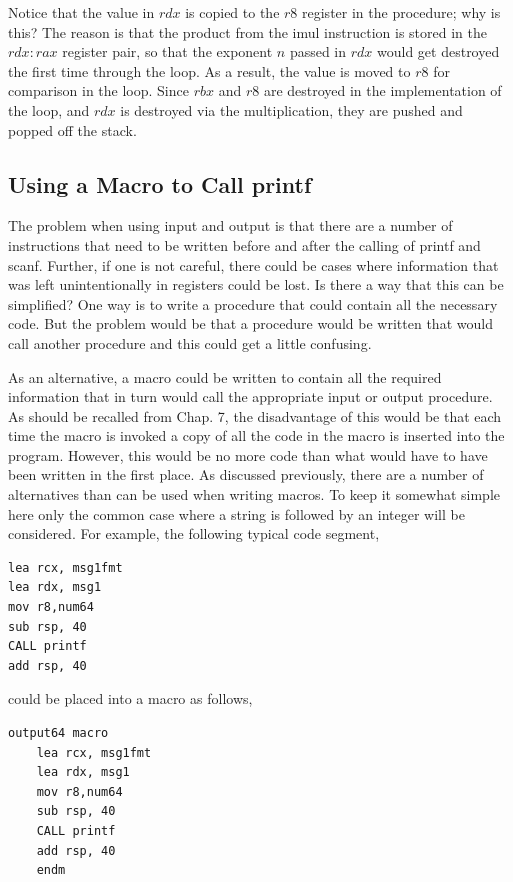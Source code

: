 \documentclass[10pt]{book}
\begin{document}
Notice that the value in $rdx$ is copied to the $r8$ register in the procedure; why is this? The reason is that the product from the imul instruction is stored in the $rdx\!:\!rax$ register pair, so that the exponent $n$ passed in $rdx$ would get destroyed the first time through the loop. As a result, the value is moved to $r8$ for comparison in the loop. Since $rbx$ and $r8$ are destroyed in the implementation of the loop, and $rdx$ is destroyed via the multiplication, they are pushed and popped off the stack.

\subsection{Using a Macro to Call printf}
The problem when using input and output is that there are a number of instructions that need to be written before and after the calling of printf and scanf. Further, if one is not careful, there could be cases where information that was left unintentionally in registers could be lost. Is there a way that this can be simplified? One way is to write a procedure that could contain all the necessary code. But the problem would be that a procedure would be written that would call another procedure and this could get a little confusing.

As an alternative, a macro could be written to contain all the required information that in turn would call the appropriate input or output procedure. As should be recalled from Chap. 7, the disadvantage of this would be that each time the macro is invoked a copy of all the code in the macro is inserted into the program. However, this would be no more code than what would have to have been written in the first place. As discussed previously, there are a number of alternatives than can be used when writing macros. To keep it somewhat simple here only the common case where a string is followed by an integer will be considered. For example, the following typical code segment,

\begin{verbatim}
lea rcx, msg1fmt
lea rdx, msg1
mov r8,num64
sub rsp, 40
CALL printf
add rsp, 40
\end{verbatim}

could be placed into a macro as follows,

\begin{verbatim}
output64 macro
    lea rcx, msg1fmt
    lea rdx, msg1
    mov r8,num64
    sub rsp, 40
    CALL printf
    add rsp, 40
    endm
\end{verbatim}
\end{document}
